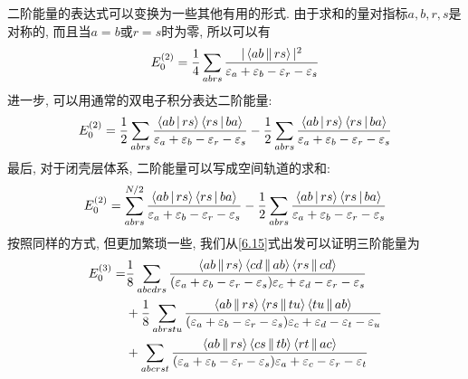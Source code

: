 二阶能量的表达式可以变换为一些其他有用的形式. 由于求和的量对指标$a,b, r,s$是对称的, 而且当$a=b$或$r=s$时为零, 所以可以有
\begin{align}
E_0^{(2)} = \frac{1}{4} \sum_{abrs}\frac{|\Braket{ab||rs}|^2}{\varepsilon_a + \varepsilon_b -\varepsilon_r-\varepsilon_s}
\label{6.72}
\end{align}
进一步, 可以用通常的双电子积分表达二阶能量:
\begin{align}
E_0^{(2)} = \frac{1}{2}\sum_{abrs}\frac{\Braket{ab|rs}\Braket{rs|ba}}{\varepsilon_a + \varepsilon_b -\varepsilon_r-\varepsilon_s}-\frac{1}{2}\sum_{abrs}\frac{\Braket{ab|rs}\Braket{rs|ba}}{\varepsilon_a + \varepsilon_b -\varepsilon_r-\varepsilon_s}
\label{6.73}
\end{align}
最后, 对于闭壳层体系, 二阶能量可以写成空间轨道的求和:
\begin{align}
E_0^{(2)} = \sum_{abrs}^{N/2}\frac{\Braket{ab|rs}\Braket{rs|ba}}{\varepsilon_a + \varepsilon_b -\varepsilon_r-\varepsilon_s}-\frac{1}{2}\sum_{abrs}\frac{\Braket{ab|rs}\Braket{rs|ba}}{\varepsilon_a + \varepsilon_b -\varepsilon_r-\varepsilon_s}
\label{6.74}
\end{align}
按照同样的方式, 但更加繁琐一些, 我们从\eqref{6.15}式出发可以证明三阶能量为
\begin{align}
E_0^{(3)} = & \frac{1}{8} \sum_{abcdrs} \frac{\Braket{ab||rs}\Braket{cd||ab}\Braket{rs||cd}}{(\varepsilon_a + \varepsilon_b -\varepsilon_r-\varepsilon_s){\varepsilon_c + \varepsilon_d -\varepsilon_r-\varepsilon_s}} \notag\\
          & + \frac{1}{8}\sum_{abrstu}\frac{\Braket{ab||rs}\Braket{rs||tu}\Braket{tu||ab}}{(\varepsilon_a + \varepsilon_b -\varepsilon_r-\varepsilon_s){\varepsilon_c + \varepsilon_d -\varepsilon_t-\varepsilon_u}} \notag\\
          & + \sum_{abcrst}\frac{\Braket{ab||rs}\Braket{cs||tb}\Braket{rt||ac}}{(\varepsilon_a + \varepsilon_b -\varepsilon_r-\varepsilon_s){\varepsilon_a + \varepsilon_c -\varepsilon_r-\varepsilon_t}}
          \label{6.75}
\end{align}

